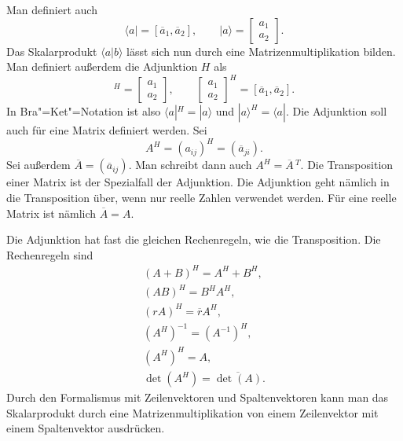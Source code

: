 \documentclass[a4paper,11pt,fleqn,twocolumn,twoside]{scrartcl}
\numberwithin{equation}{section}
\begin{document}
Man definiert auch
\begin{equation}
\langle a| = [\overline a_1,\overline a_2],\qquad
|a\rangle = \begin{bmatrix}a_1\\ a_2\end{bmatrix}.
\end{equation}
Das Skalarprodukt $\langle a|b\rangle$ lässt sich nun durch eine
Matrizenmultiplikation bilden. Man definiert außerdem die
Adjunktion $H$ als
\begin{equation}
[\overline a_1,\overline a_2]^H
= \begin{bmatrix}a_1\\ a_2\end{bmatrix},\qquad
\begin{bmatrix}a_1\\ a_2\end{bmatrix}^H
= [\overline a_1,\overline a_2].
\end{equation}
In Bra"=Ket"=Notation ist also $\langle a|^H=|a\rangle$ und
$|a\rangle^H=\langle a|$. Die Adjunktion soll auch für eine Matrix
definiert werden. Sei
\begin{equation}
A^H = (a_{ij})^H = (\overline a_{ji}).
\end{equation}
Sei außerdem $\overline A=(\overline a_{ij})$. Man schreibt dann
auch $A^H = \overline A\,{}^T$. Die Transposition einer Matrix ist
der Spezialfall der Adjunktion. Die Adjunktion geht nämlich in die
Transposition über, wenn nur reelle Zahlen verwendet werden. Für eine
reelle Matrix ist nämlich $\overline A=A$.

Die Adjunktion hat fast die gleichen Rechenregeln, wie die
Transposition. Die Rechenregeln sind
\begin{gather}
(A+B)^H = A^H+B^H,\\
(AB)^H = B^H A^H,\\
(rA)^H = \overline r A^H,\\
(A^H)^{-1} = (A^{-1})^H,\\
(A^H)^H = A,\\
\det(A^H) = \overline{\det(A)}.
\end{gather}
Durch den Formalismus mit Zeilenvektoren und Spaltenvektoren kann man
das Skalarprodukt durch eine Matrizenmultiplikation von einem
Zeilenvektor mit einem Spaltenvektor ausdrücken.
\end{document}

